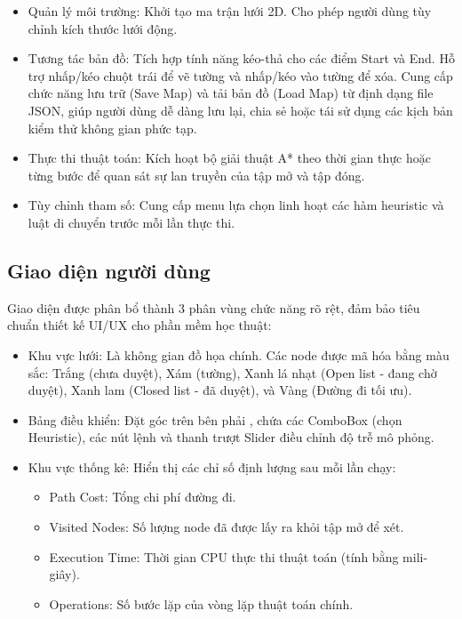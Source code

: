 \documentclass[12pt,a4paper]{report}
\begin{document}
\begin{itemize}
    \item Quản lý môi trường: Khởi tạo ma trận lưới 2D. Cho phép người dùng tùy chỉnh kích thước lưới động.
    \item Tương tác bản đồ: Tích hợp tính năng kéo-thả cho các điểm Start và End. Hỗ trợ nhấp/kéo chuột trái để vẽ tường và nhấp/kéo vào tường để xóa. Cung cấp chức năng lưu trữ (Save Map) và tải bản đồ (Load Map) từ định dạng file JSON, giúp người dùng dễ dàng lưu lại, chia sẻ hoặc tái sử dụng các kịch bản kiểm thử không gian phức tạp.
    \item Thực thi thuật toán: Kích hoạt bộ giải thuật A* theo thời gian thực hoặc từng bước để quan sát sự lan truyền của tập mở và tập đóng.
    \item Tùy chỉnh tham số: Cung cấp menu lựa chọn linh hoạt các hàm heuristic và luật di chuyển trước mỗi lần thực thi.
\end{itemize}

\subsection{Giao diện người dùng}
Giao diện được phân bổ thành 3 phân vùng chức năng rõ rệt, đảm bảo tiêu chuẩn thiết kế UI/UX cho phần mềm học thuật:
\begin{itemize}
    \item Khu vực lưới: Là không gian đồ họa chính. Các node được mã hóa bằng màu sắc: Trắng (chưa duyệt), Xám (tường), Xanh lá nhạt (Open list - đang chờ duyệt), Xanh lam (Closed list - đã duyệt), và Vàng (Đường đi tối ưu).
    \item Bảng điều khiển: Đặt góc trên bên phải , chứa các ComboBox (chọn Heuristic), các nút lệnh và thanh trượt Slider điều chỉnh độ trễ mô phỏng.
    \item Khu vực thống kê: Hiển thị các chỉ số định lượng sau mỗi lần chạy:
    \begin{itemize}
        \item Path Cost: Tổng chi phí đường đi.
        \item Visited Nodes: Số lượng node đã được lấy ra khỏi tập mở để xét.
        \item Execution Time: Thời gian CPU thực thi thuật toán (tính bằng mili-giây).
        \item Operations: Số bước lặp của vòng lặp thuật toán chính.
    \end{itemize}
\end{itemize}
\end{document}
